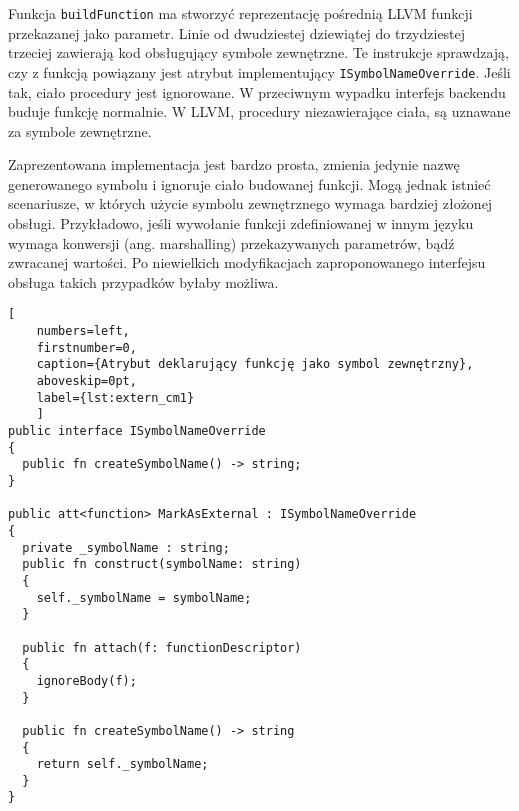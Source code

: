 Funkcja \lstinline{buildFunction} ma stworzyć reprezentację pośrednią LLVM funkcji przekazanej jako parametr.
Linie od dwudziestej dziewiątej do trzydziestej trzeciej zawierają kod obsługujący symbole zewnętrzne.
Te instrukcje sprawdzają, czy z funkcją powiązany jest atrybut implementujący \lstinline{ISymbolNameOverride}.
Jeśli tak, ciało procedury jest ignorowane.
W przeciwnym wypadku interfejs backendu buduje funkcję normalnie.
W LLVM, procedury niezawierające ciała, są uznawane za symbole zewnętrzne.

Zaprezentowana implementacja jest bardzo prosta, zmienia jedynie nazwę generowanego symbolu i ignoruje ciało budowanej funkcji.
Mogą jednak istnieć scenariusze, w których użycie symbolu zewnętrznego wymaga bardziej złożonej obsługi.
Przykładowo, jeśli wywołanie funkcji zdefiniowanej w innym języku wymaga konwersji (ang. marshalling) przekazywanych parametrów, bądź zwracanej wartości.
Po niewielkich modyfikacjach zaproponowanego interfejsu obsługa takich przypadków byłaby możliwa.

\begin{minipage}{\linewidth}
  
  \begin{lstlisting}[
    numbers=left,
    firstnumber=0,
    caption={Atrybut deklarujący funkcję jako symbol zewnętrzny},
    aboveskip=0pt,
    label={lst:extern_cm1}
    ]
public interface ISymbolNameOverride
{
  public fn createSymbolName() -> string;
}

public att<function> MarkAsExternal : ISymbolNameOverride
{
  private _symbolName : string;
  public fn construct(symbolName: string)
  {
    self._symbolName = symbolName;
  }

  public fn attach(f: functionDescriptor)
  {
    ignoreBody(f);
  }

  public fn createSymbolName() -> string
  {
    return self._symbolName;
  }
}
\end{lstlisting}
\end{minipage}

